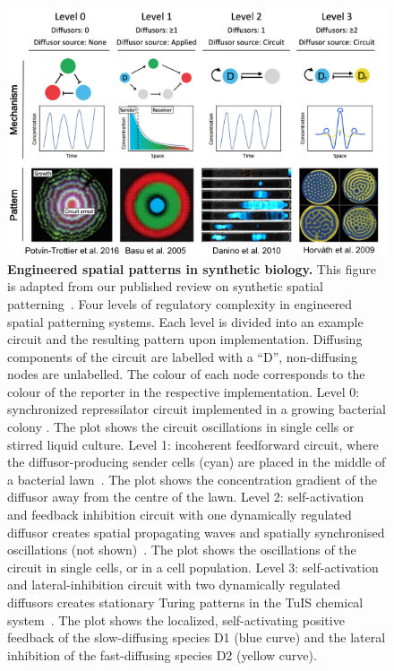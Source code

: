 \begin{figure}[H]
    \centering
    \includegraphics[width=1\textwidth]{chapters/Introduction/spatial_components}
    \caption{\textbf{Engineered spatial patterns in synthetic biology.} This figure is adapted from our published review on synthetic spatial patterning~\parencite{huidobro}. Four levels of regulatory complexity in engineered spatial patterning systems. Each level is divided into an example circuit and the resulting pattern upon implementation. Diffusing components of the circuit are labelled with a “D”, non-diffusing nodes are unlabelled. The colour of each node corresponds to the colour of the reporter in the respective implementation. Level 0: synchronized repressilator circuit implemented in a growing bacterial colony \parencite{Potvin-Trottier2016}. The plot shows the circuit oscillations in single cells or stirred liquid culture. Level 1: incoherent feedforward circuit, where the diffusor-producing sender cells (cyan) are placed in the middle of a bacterial lawn~\parencite{Basu2005}. The plot shows the concentration gradient of the diffusor away from the centre of the lawn. Level 2: self-activation and feedback inhibition circuit with one dynamically regulated diffusor creates spatial propagating waves and spatially synchronised oscillations (not shown)~\parencite{Danino2010}. The plot shows the oscillations of the circuit in single cells, or in a cell population. Level 3: self-activation and lateral-inhibition circuit with two dynamically regulated diffusors creates stationary Turing patterns in the TuIS chemical system~\parencite{Horvath}. The plot shows the localized, self-activating positive feedback of the slow-diffusing species D1 (blue curve) and the lateral inhibition of the fast-diffusing species D2 (yellow curve).}
    \label{fig:engineered_patterns}
\end{figure}

